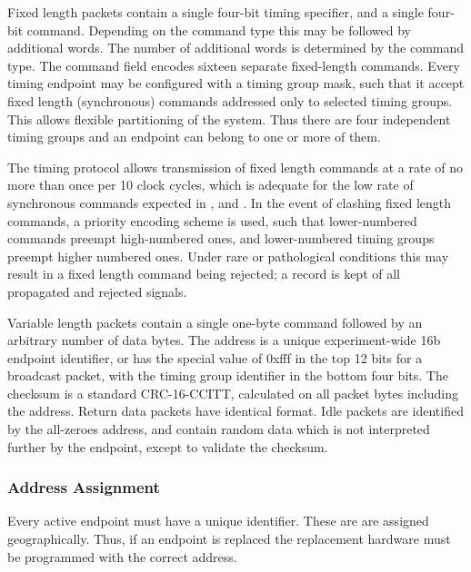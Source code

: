 \documentclass{dune}
\begin{document}
Fixed length packets contain a single four-bit timing  specifier, and a single four-bit command. Depending on the command type this may be followed by additional words. The number of additional words is determined by the command type. The command field encodes sixteen separate fixed-length commands. Every timing endpoint may be configured with a timing group mask, such that it accept fixed length (synchronous) commands addressed only to selected timing groups. This allows flexible partitioning of the system. Thus there are four independent timing groups and an endpoint can belong to one or more of them.

The timing protocol allows transmission of fixed length commands at a rate of no more than once per 10 clock cycles, which is adequate for the low rate of synchronous commands expected in , and  . In the event of clashing fixed length commands, a priority encoding scheme is used, such that lower-numbered commands preempt high-numbered ones, and lower-numbered timing groups preempt higher numbered ones. Under rare or pathological conditions this may result in a fixed length command being rejected; a record is kept of all propagated and rejected signals.

Variable length packets contain a single one-byte command followed by an arbitrary number of data bytes. The address is a unique experiment-wide 16b endpoint identifier, or has the special value of 0xfff in the top 12 bits for a broadcast packet, with the timing group identifier in the bottom four bits. The checksum is a standard CRC-16-CCITT, calculated on all packet bytes including the address. Return data packets have identical format. Idle packets are identified by the all-zeroes address, and contain random data which is not interpreted further by the endpoint, except to validate the checksum.

\subsubsection{Address Assignment}




Every active endpoint must have a unique identifier. These are are assigned geographically. Thus, if an endpoint is replaced the replacement hardware must be programmed with the correct address.
\end{document}
